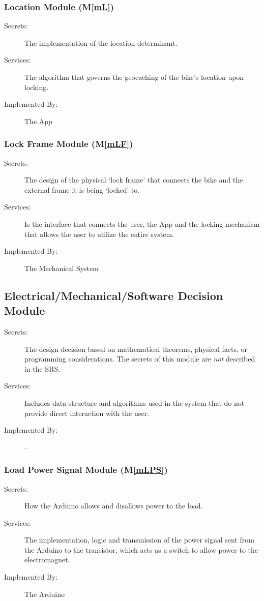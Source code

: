 \documentclass[12pt, titlepage]{article}
\newcommand{\mref}[1]{M\ref{#1}}
\begin{document}
\subsubsection{Location Module (\mref{mL})}
\begin{description}
\item[Secrets:]The implementation of the location determinant.
\item[Services:]The algorithm that governs the geocaching of the bike’s location upon locking.
\item[Implemented By:]The App
\end{description}

\subsubsection{Lock Frame Module (\mref{mLF})}
\begin{description}
\item[Secrets:]The design of the physical ‘lock frame’ that connects the bike and the external frame it is being ‘locked’ to.
\item[Services:]Is the interface that connects the user, the App and the locking mechanism that allows the user to utilize the entire system.
\item[Implemented By:]The Mechanical System
\end{description}

\subsection{Electrical/Mechanical/Software Decision Module}

\begin{description}
\item[Secrets:] The design decision based on mathematical theorems, physical
  facts, or programming considerations. The secrets of this module are
  \emph{not} described in the SRS.
\item[Services:] Includes data structure and algorithms used in the system that
  do not provide direct interaction with the user. 
\item[Implemented By:] --
\end{description}

\subsubsection{Load Power Signal Module (\mref{mLPS})}
\begin{description}
\item[Secrets:]How the Arduino allows and disallows power to the load.
\item[Services:]The implementation, logic and transmission of the power signal sent from the Arduino to the transistor, which acts as a switch to allow power to the electromagnet.
\item[Implemented By:]The Arduino
\end{description}
\end{document}
